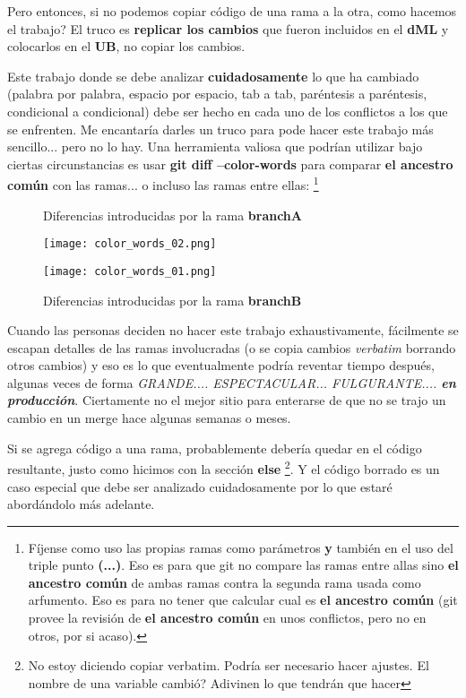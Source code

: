 Pero entonces, si no podemos copiar código de una rama a la otra, como hacemos el trabajo? El truco es {\bf replicar los cambios}
que fueron incluidos en el {\bf dML} y colocarlos en el {\bf UB}, no copiar los cambios.

Este trabajo donde se debe analizar {\bf cuidadosamente} lo que ha cambiado (palabra por palabra, espacio por espacio, tab a tab,
paréntesis a paréntesis, condicional a condicional) debe ser hecho en cada uno de los conflictos a los que se enfrenten. Me encantaría
darles un truco para pode hacer este trabajo más sencillo... pero no lo hay. Una herramienta valiosa que podrían utilizar
bajo ciertas circunstancias es usar {\bf git diff --color-words} para comparar {\bf el ancestro común} con las ramas... o incluso
las ramas entre ellas:
\footnote{Fíjense como uso las propias ramas como parámetros {\bf y} también en el uso del triple punto {\bf (...)}. Eso es para que
git no compare las ramas entre allas sino {\bf el ancestro común} de ambas ramas contra la segunda rama usada como arfumento. Eso es para
no tener que calcular cual es {\bf el ancestro común} (git provee la revisión de {\bf el ancestro común} en unos conflictos, pero
no en otros, por si acaso).}


\begin{figure}
	\centering
	\caption{Diferencias introducidas por la rama {\bf branchA}}
	\texttt{[image: color\_words\_02.png]}
	\caption{Diferencias introducidas por la rama {\bf branchB}}
	\texttt{[image: color\_words\_01.png]}
\end{figure}

Cuando las personas deciden no hacer este trabajo exhaustivamente, fácilmente se escapan detalles de las ramas involucradas
(o se copia cambios {\it verbatim} borrando otros cambios) y eso es lo que eventualmente podría reventar tiempo después, algunas
veces de forma {\it GRANDE.... ESPECTACULAR... FULGURANTE.... {\bf en producción}}. Ciertamente no el mejor sitio para
enterarse de que no se trajo un cambio en un merge hace algunas semanas o meses.

Si se agrega código a una rama, probablemente debería quedar en el código resultante, justo como hicimos con la sección {\bf else}
\footnote{No estoy diciendo copiar verbatim. Podría ser necesario hacer ajustes. El nombre de una variable cambió? Adivinen
lo que tendrán que hacer}. Y el código borrado es un caso especial que debe ser analizado cuidadosamente por lo que estaré
abordándolo más adelante.

